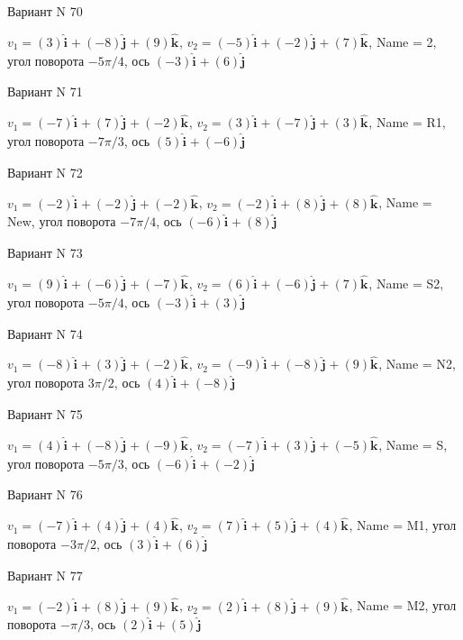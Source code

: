 \documentclass[11pt]{report}
\begin{document}
Вариант N 70

$v_1 = (3)\mathbf{\hat{i}_{}} + (-8)\mathbf{\hat{j}_{}} + (9)\mathbf{\hat{k}_{}}$, $v_2 = (-5)\mathbf{\hat{i}_{}} + (-2)\mathbf{\hat{j}_{}} + (7)\mathbf{\hat{k}_{}}$, Name = 2, угол поворота $- 5 \pi / 4$, ось $(-3)\mathbf{\hat{i}_{}} + (6)\mathbf{\hat{j}_{}}$

Вариант N 71

$v_1 = (-7)\mathbf{\hat{i}_{}} + (7)\mathbf{\hat{j}_{}} + (-2)\mathbf{\hat{k}_{}}$, $v_2 = (3)\mathbf{\hat{i}_{}} + (-7)\mathbf{\hat{j}_{}} + (3)\mathbf{\hat{k}_{}}$, Name = R1, угол поворота $- 7 \pi / 3$, ось $(5)\mathbf{\hat{i}_{}} + (-6)\mathbf{\hat{j}_{}}$

Вариант N 72

$v_1 = (-2)\mathbf{\hat{i}_{}} + (-2)\mathbf{\hat{j}_{}} + (-2)\mathbf{\hat{k}_{}}$, $v_2 = (-2)\mathbf{\hat{i}_{}} + (8)\mathbf{\hat{j}_{}} + (8)\mathbf{\hat{k}_{}}$, Name = New, угол поворота $- 7 \pi / 4$, ось $(-6)\mathbf{\hat{i}_{}} + (8)\mathbf{\hat{j}_{}}$

Вариант N 73

$v_1 = (9)\mathbf{\hat{i}_{}} + (-6)\mathbf{\hat{j}_{}} + (-7)\mathbf{\hat{k}_{}}$, $v_2 = (6)\mathbf{\hat{i}_{}} + (-6)\mathbf{\hat{j}_{}} + (7)\mathbf{\hat{k}_{}}$, Name = S2, угол поворота $- 5 \pi / 4$, ось $(-3)\mathbf{\hat{i}_{}} + (3)\mathbf{\hat{j}_{}}$

Вариант N 74

$v_1 = (-8)\mathbf{\hat{i}_{}} + (3)\mathbf{\hat{j}_{}} + (-2)\mathbf{\hat{k}_{}}$, $v_2 = (-9)\mathbf{\hat{i}_{}} + (-8)\mathbf{\hat{j}_{}} + (9)\mathbf{\hat{k}_{}}$, Name = N2, угол поворота $3 \pi / 2$, ось $(4)\mathbf{\hat{i}_{}} + (-8)\mathbf{\hat{j}_{}}$

Вариант N 75

$v_1 = (4)\mathbf{\hat{i}_{}} + (-8)\mathbf{\hat{j}_{}} + (-9)\mathbf{\hat{k}_{}}$, $v_2 = (-7)\mathbf{\hat{i}_{}} + (3)\mathbf{\hat{j}_{}} + (-5)\mathbf{\hat{k}_{}}$, Name = S, угол поворота $- 5 \pi / 3$, ось $(-6)\mathbf{\hat{i}_{}} + (-2)\mathbf{\hat{j}_{}}$

Вариант N 76

$v_1 = (-7)\mathbf{\hat{i}_{}} + (4)\mathbf{\hat{j}_{}} + (4)\mathbf{\hat{k}_{}}$, $v_2 = (7)\mathbf{\hat{i}_{}} + (5)\mathbf{\hat{j}_{}} + (4)\mathbf{\hat{k}_{}}$, Name = M1, угол поворота $- 3 \pi / 2$, ось $(3)\mathbf{\hat{i}_{}} + (6)\mathbf{\hat{j}_{}}$

Вариант N 77

$v_1 = (-2)\mathbf{\hat{i}_{}} + (8)\mathbf{\hat{j}_{}} + (9)\mathbf{\hat{k}_{}}$, $v_2 = (2)\mathbf{\hat{i}_{}} + (8)\mathbf{\hat{j}_{}} + (9)\mathbf{\hat{k}_{}}$, Name = M2, угол поворота $- \pi / 3$, ось $(2)\mathbf{\hat{i}_{}} + (5)\mathbf{\hat{j}_{}}$
\end{document}

